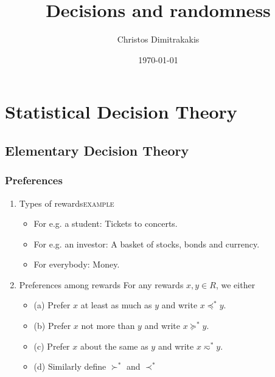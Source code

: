 \documentclass[smaller]{article}
\author{Christos Dimitrakakis}
\date{\today}
\title{Decisions and randomness}
\begin{document}
\maketitle
\tableofcontents


\section{Statistical Decision Theory}
\label{sec:org48db53b}
\subsection{Elementary Decision Theory}
\label{sec:org587742e}
\subsubsection{Preferences}
\label{sec:orgd5d7a3d}
\begin{enumerate}
\item Types of rewards\hfill{}\textsc{example}
\label{sec:org35be53d}
\begin{itemize}
\item For e.g. a student: Tickets to concerts.
\item For e.g. an investor: A basket of stocks, bonds and currency.
\item For everybody: Money.
\end{itemize}

\item Preferences among rewards
\label{sec:org5825614}
For any rewards \(x, y \in R\), we either
\begin{itemize}
\item (a) Prefer \(x\) at least as much as \(y\) and write \(x \preceq^* y\).
\item (b) Prefer \(x\) not more than \(y\) and write \(x \succeq^* y\).
\item (c) Prefer \(x\) about the same as \(y\) and write \(x \eqsim^* y\).
\item (d) Similarly define \(\succ^*\) and \(\prec^*\)
\end{itemize}
\end{enumerate}
\end{document}
